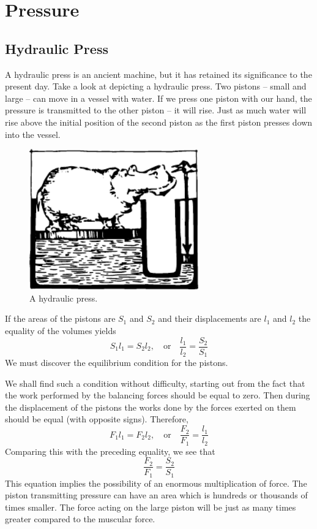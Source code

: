 
\chapter{Pressure}
\section{Hydraulic Press}
A hydraulic press is an ancient machine, but it has retained its significance to the present day. Take a look at  depicting a hydraulic press. Two pistons -- small and large -- can move in a vessel with water. If we press one piston with our hand, the pressure is transmitted to the other piston -- it will rise. Just as much water will rise above the initial position of the second piston as the first piston presses down into the vessel.
\begin{figure}[!ht]
\centering
\includegraphics[width=0.65\textwidth]{figures/fig-7-1.pdf}
\caption{A hydraulic press.}
\label{fig-7-01}
\end{figure}


If the areas of the pistons are $S_{1}$ and $S_{2}$ and their displacements are $l_{1}$ and $l_{2}$ the equality of the volumes
yields 
\begin{equation*}%
S_{1} l_{1} = S_{2} l_{2}, \quad \textrm{or} \quad \dfrac{l_{1}}{l_{2}} =\dfrac{S_{2}}{S_{1}} 
\end{equation*}
We must discover the equilibrium condition for the pistons.

We shall find such a condition without difficulty, starting out from the fact that the work performed by the balancing forces should be equal to zero. Then during the displacement of the pistons the works done by the forces exerted on them should be equal (with opposite signs). Therefore,
\begin{equation*}%
F_{1} l_{1} = F_{2} l_{2}, \quad \textrm{or} \quad \dfrac{F_{2}}{F_{1}} =\dfrac{l_{1}}{l_{2}} 
\end{equation*}
Comparing this with the preceding equality, we see that
\begin{equation*}%
\dfrac{F_{2}}{F_{1}} =\dfrac{S_{2}}{S_{1}} 
\end{equation*}
This equation implies the possibility of an enormous
multiplication of force. The piston transmitting pressure
can have an area which is hundreds or thousands of
times smaller. The force acting on the large piston will
be just as many times greater compared to the muscular
force.

